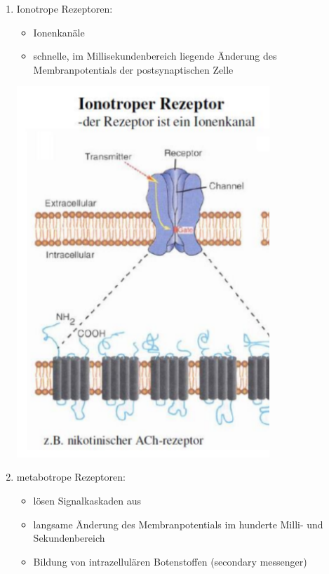 \begin{enumerate}
	\item Ionotrope Rezeptoren:
		\begin{itemize}
			\item Ionenkanäle
			\item schnelle, im Millisekundenbereich liegende Änderung des Membranpotentials der postsynaptischen Zelle
		\end{itemize}
	\includegraphics[width=0.75\textwidth]{lectures/160405/pix/ionotrop.png}\newpage
	\item metabotrope Rezeptoren:
		\begin{itemize}
			\item lösen Signalkaskaden aus
			\item langsame Änderung des Membranpotentials im hunderte Milli- und Sekundenbereich
			\item Bildung von intrazellulären Botenstoffen (secondary messenger)
		\end{itemize}

\end{enumerate}
